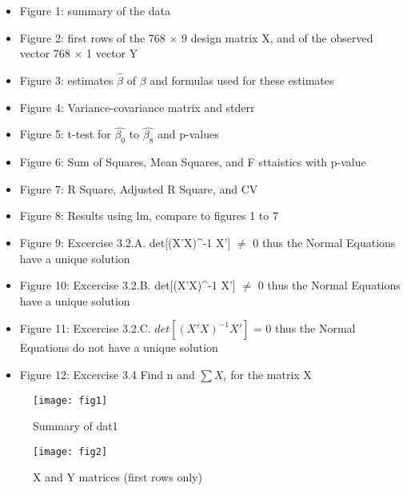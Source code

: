 \documentclass[letterpaper,11pt]{article}
\begin{document}
	\begin{itemize}
	\item Figure 1: summary of the data 

	\item Figure 2: first rows of the 768 $\times$ 9 design matrix X, and of the observed vector 768 $\times$ 1 vector Y

	\item Figure 3: estimates $\hat{\beta}$ of $\beta$ and formulas used for these estimates
	
	\item Figure 4: Variance-covariance matrix and stderr

	\item Figure 5: t-test for $\hat{\beta_{0}}$ to $\hat{\beta_{8}}$ and p-values

	\item Figure 6: Sum of Squares, Mean Squares, and F sttaistics with p-value

	\item Figure 7: R Square, Adjusted R Square, and CV

	\item Figure 8: Results using lm, compare to figures 1 to 7
	
	\item Figure 9: Excercise 3.2.A. det[(X'X)^{-1} X'] $\neq$ 0 thus the Normal Equations have a unique solution  

	\item Figure 10: Excercise 3.2.B. det[(X'X)^{-1} X'] $\neq$ 0 thus the Normal Equations have a unique solution  

	\item Figure 11: Excercise 3.2.C. $det[(X'X)^{-1} X']$ = 0 thus the Normal Equations do not have a unique solution  
	
	\item Figure 12: Excercise 3.4 Find n and $\sum{X_{i}}$ for the matrix X
	\end{itemize}
		
	\begin{figure}[h!]
	\centering
	\texttt{[image: fig1]}
	\caption{Summary of dat1}
	\end{figure}
	


	\begin{figure}[h!]
	\centering
	\texttt{[image: fig2]}
	\caption{X and Y matrices (first rows only)}
	\end{figure}
		
\end{document}
